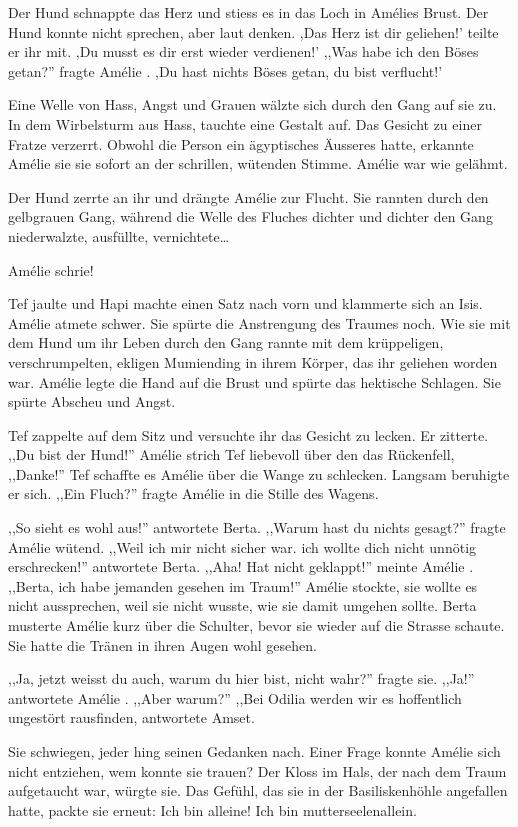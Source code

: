 \documentclass[11pt,titlepage,a5paper]{book}
\newcommand{\am}{Amélie }
\begin{document}
 Der Hund schnappte das Herz und stiess es in das Loch in Amélies Brust. Der Hund konnte nicht sprechen, aber laut denken. ,Das Herz ist dir geliehen!' teilte er ihr mit. ,Du musst es dir erst wieder verdienen!' ,,Was habe ich den Böses getan?'' fragte \am . ,Du hast nichts Böses getan, du bist verflucht!'
 
 Eine Welle von Hass, Angst und Grauen wälzte sich durch den Gang auf sie zu. In dem Wirbelsturm aus Hass, tauchte eine Gestalt auf. Das Gesicht zu einer Fratze verzerrt. Obwohl die Person ein ägyptisches Äusseres hatte, erkannte \am sie sie sofort an der schrillen, wütenden Stimme. \am war wie gelähmt.
 
 Der Hund zerrte an ihr und drängte \am zur Flucht. Sie rannten durch den gelbgrauen Gang, während die Welle des Fluches dichter und dichter den Gang niederwalzte, ausfüllte, vernichtete\dots
 
\am schrie!

Tef jaulte und Hapi machte einen Satz nach vorn und klammerte sich an Isis. \am atmete schwer. Sie spürte die Anstrengung des Traumes noch. Wie sie mit dem Hund um ihr Leben durch den Gang rannte mit dem krüppeligen, verschrumpelten, ekligen Mumiending in ihrem Körper, das ihr geliehen worden war. \am legte die Hand auf die Brust und spürte das hektische Schlagen. Sie spürte Abscheu und Angst.

Tef zappelte auf dem Sitz und versuchte ihr das Gesicht zu lecken. Er zitterte. ,,Du bist der Hund!'' \am strich Tef liebevoll über den das Rückenfell, ,,Danke!'' Tef schaffte es \am über die Wange zu schlecken. Langsam beruhigte er sich. ,,Ein Fluch?'' fragte \am in die Stille des Wagens. 

,,So sieht es wohl aus!'' antwortete Berta. ,,Warum hast du nichts gesagt?'' fragte \am wütend. ,,Weil ich mir nicht sicher war. ich wollte dich nicht unnötig erschrecken!'' antwortete Berta. ,,Aha! Hat nicht geklappt!'' meinte \am . ,,Berta, ich habe jemanden gesehen im Traum!'' \am stockte, sie wollte es nicht aussprechen, weil sie nicht wusste, wie sie damit umgehen sollte. Berta musterte \am kurz über die Schulter, bevor sie wieder auf die Strasse schaute. Sie hatte die Tränen in ihren Augen wohl gesehen. 

,,Ja, jetzt weisst du auch, warum du hier bist, nicht wahr?'' fragte sie. ,,Ja!'' antwortete \am . ,,Aber warum?'' ,,Bei Odilia werden wir es hoffentlich ungestört rausfinden, antwortete Amset. 

Sie schwiegen, jeder hing seinen Gedanken nach. Einer Frage konnte \am sich nicht entziehen, wem konnte sie trauen? Der Kloss im Hals, der nach dem Traum aufgetaucht war, würgte sie. Das Gefühl, das sie in der Basiliskenhöhle angefallen hatte, packte sie erneut: Ich bin alleine! Ich bin mutterseelenallein.
\end{document}
